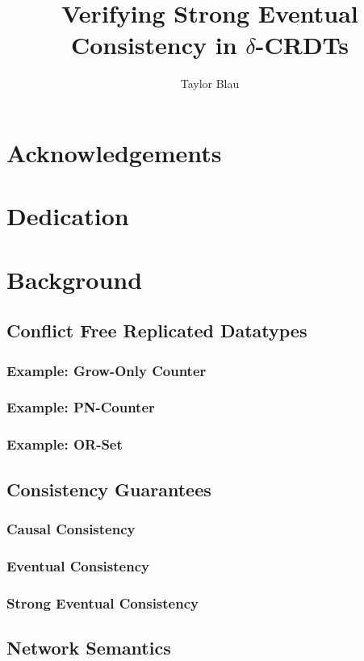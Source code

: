 \documentclass{thesis}
\title{Verifying Strong Eventual Consistency in $\delta$-CRDTs}
\author{Taylor Blau}
\begin{document}

  

  \frontmatter
  \cleardoublepage

  
  \chapter{Acknowledgements}
  \chapter{Dedication}

  \tableofcontents

  \mainmatter
  

  \chapter{Background}
  \section{Conflict Free Replicated Datatypes}
  \subsection{Example: Grow-Only Counter}
  \subsection{Example: PN-Counter}
  \subsection{Example: OR-Set}
  \section{Consistency Guarantees}
  \subsection{Causal Consistency}
  \subsection{Eventual Consistency}
  \subsection{Strong Eventual Consistency}
  \section{Network Semantics}
\end{document}
